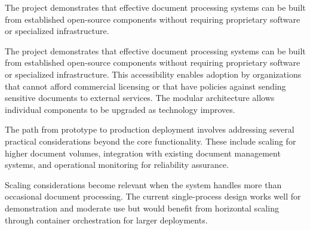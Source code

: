 \bigskip

The project demonstrates that effective document processing systems can be built from established open-source components without requiring proprietary software or specialized infrastructure.

The project demonstrates that effective document processing systems can be built from established open-source components without requiring proprietary software or specialized infrastructure. This accessibility enables adoption by organizations that cannot afford commercial licensing or that have policies against sending sensitive documents to external services. The modular architecture allows individual components to be upgraded as technology improves.

\bigskip

The path from prototype to production deployment involves addressing several practical considerations beyond the core functionality. These include scaling for higher document volumes, integration with existing document management systems, and operational monitoring for reliability assurance.

Scaling considerations become relevant when the system handles more than occasional document processing. The current single-process design works well for demonstration and moderate use but would benefit from horizontal scaling through container orchestration for larger deployments.
